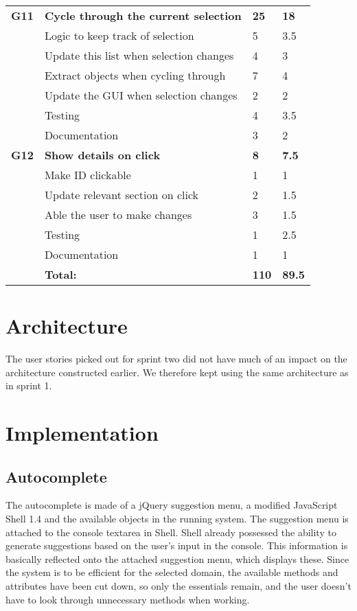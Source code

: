 \begin{table}
\begin{tabular}{ l p{8cm} l l }
 \bf{G11}	  &\bf{Cycle through the current selection}	&\bf{25}		&\bf{18}		     \\
		  &Logic to keep track of selection			&5			&3.5		\\
		  &Update this list when selection changes	&4			&3		\\
		  &Extract objects when cycling through		&7			&4		\\
		  &Update the GUI when selection changes	&2			&2		\\
		  &Testing							&4			&3.5		\\
		  &Documentation						&3			&2		\\

\bf{G12}	  &\bf{Show details on click}			&\bf{8}		&\bf{7.5}		     \\
		  &Make ID clickable					&1			&1		\\
		  &Update relevant section on click		&2			&1.5		\\
		  &Able the user to make changes		&3			&1.5		\\
		  &Testing						&1			&2.5		\\
		  &Documentation					&1			&1		\\
\hline 
		  &\bf{Total:}						&\bf{110}		&\bf{89.5}		\\
\hline
\end{tabular}
\label{table:sp2backlog}
\end{table}


\section{Architecture}
The user stories picked out for sprint two did not have much of an impact on the architecture constructed earlier. We therefore kept using the same architecture as in sprint 1. 

\section{Implementation}

\subsection{Autocomplete}
The autocomplete is made of a jQuery suggestion menu, a modified JavaScript Shell 1.4 and the available objects in the running system. The suggestion menu is attached to the console textarea in Shell. Shell already possessed the ability to generate suggestions based on the user’s input in the console. This information is basically reflected onto the attached suggestion menu, which displays these. Since the system is to be efficient for the selected domain, the available methods and attributes have been cut down, so only the essentials remain, and the user doesn't have to look through unnecessary methods when working.

